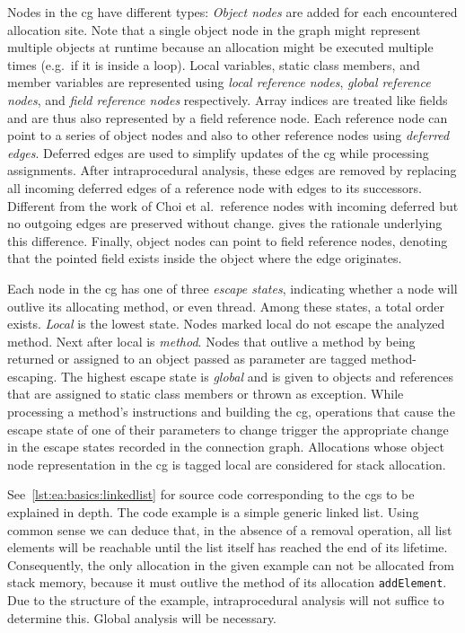 			Nodes in the \gls{cg} have different types: \emph{Object nodes} are added for each encountered allocation site.
			Note that a single object node in the graph might represent multiple objects at runtime because an allocation
			might be executed multiple times (e.g.\ if it is inside a loop). Local variables, static class members, and member
			variables are represented using \emph{local reference nodes}, \emph{global reference nodes}, and \emph{field
			reference nodes} respectively. Array indices are treated like fields and are thus also represented by a field
			reference node. Each reference node can point to a series of object nodes and also to other reference nodes using
			\emph{deferred edges}. Deferred edges are used to simplify updates of the \gls{cg} while processing assignments.
			After intraprocedural analysis, these edges are removed by replacing all incoming deferred edges of a reference
			node with edges to its successors. Different from the work of Choi et al.\ reference nodes with incoming deferred
			but no outgoing edges are preserved without change.  gives the rationale
			underlying this difference. Finally, object nodes can point to field reference nodes, denoting that the pointed
			field exists inside the object where the edge originates.

			Each node in the \gls{cg} has one of three \emph{escape states}, indicating whether a node will outlive its
			allocating method, or even thread. Among these states, a total order exists. \emph{Local} is the lowest state.
			Nodes marked local do not escape the analyzed method. Next after local is \emph{method}. Nodes that outlive
			a method by being returned or assigned to an object passed as parameter are tagged method-escaping. The highest
			escape state is \emph{global} and is given to objects and references that are assigned to static class members or
			thrown as exception. While processing a method's instructions and building the \gls{cg}, operations that cause the
			escape state of one of their parameters to change trigger the appropriate change in the escape states recorded in
			the connection graph. Allocations whose object node representation in the \gls{cg} is tagged local are considered
			for stack allocation.

			See~\cref{lst:ea:basics:linkedlist} for source code corresponding to the \glspl{cg} to be explained in depth. The
			code example is a simple generic linked list. Using common sense we can deduce that, in the absence of a removal
			operation, all list elements will be reachable until the list itself has reached the end of its lifetime.
			Consequently, the only allocation in the given example can not be allocated from stack memory, because it must
			outlive the method of its allocation \texttt{addElement}. Due to the structure of the example, intraprocedural
			analysis will not suffice to determine this. Global analysis will be necessary.

